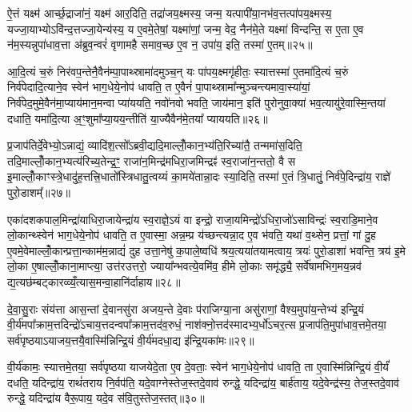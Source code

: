 ऐ॒त्तं यक्ष्म॑ आर्च्छ॒द्राजा॑नं॒ यक्ष्म॑ आर॒दिति॒ तद्रा॑जय॒क्ष्मस्य॒ जन्म॒ यत्पापी॑या॒नभ॑व॒त्तत्पा॑पय॒क्ष्मस्य॒ यज्जा॒याभ्यो\-ऽवि॑न्द॒त्तज्जा॒येन्य॑स्य॒ य ए॒वमे॒तेषां॒ यक्ष्मा॑णां॒ जन्म॒ वेद॒ नैन॑मे॒ते यक्ष्मा॑ विन्दन्ति॒ स ए॒ता ए॒व न॑म॒स्यन्नुपा॑धाव॒त्ता अ॑ब्रुव॒न्वरं॑ वृणामहै समाव॒च्छ ए॒व न॒ उपा॑य॒ इति॒ तस्मा॑ ए॒तम्॥२५॥

आ॒दि॒त्यं च॒रुं निर॑वप॒न्तेनै॒वैन॑म्पा॒पाथ्स्रामा॑दमुञ्च॒न् यः पा॑पय॒क्ष्मगृ॑हीतः॒ स्यात्तस्मा॑ ए॒तमा॑दि॒त्यं च॒रुं निर्व॑पेदादि॒त्याने॒व स्वेन॑ भाग॒धेये॒नोप॑ धावति॒ त ए॒वैनं॑ पा॒पाथ्स्रामा᳚न्मुञ्चन्त्यमावा॒स्या॑यां॒ निर्व॑पेद॒मुमे॒वैन॑मा॒प्याय॑मान॒मन्वा प्या॑ययति॒ नवो॑नवो भवति॒ जाय॑मान॒ इति॑ पुरोनुवा॒क्या॑ भव॒त्यायु॑रे॒वास्मि॒न्तया॑ दधाति॒ यमा॑दि॒त्या अ॒ꣳ॒शुमा᳚प्या॒यय॒न्तीति॑ या॒ज्यैवैन॑मे॒तया᳚ प्याययति॥२६॥

{\anuvakamend[{ए॒वोपै॒तम॑स्मि॒न्त्रयो॑दश च॥५॥}]}

प्र॒जाप॑तिर्दे॒वेभ्यो॒\-ऽन्नाद्यं॒ व्यादि॑श॒त्सो᳚\-ऽब्रवी॒द्यदि॒माल्लोँ॒कान॒भ्य॑ति॒रिच्या॑तै॒ तन्ममा॑स॒दिति॒ तदि॒माल्लोँ॒कान॒भ्यत्य॑रिच्य॒तेन्द्र॒ꣳ॒ राजा॑न॒मिन्द्र॑मधिरा॒जमिन्द्रꣴ॑ स्व॒राजा॑न॒न्ततो॒ वै स इ॒माल्लोँ॒काꣳस्त्रे॒धादु॑ह॒त्तत्त्रि॒धातो᳚स्त्रिधातु॒त्वय्यं का॒मये॑तान्ना॒दः स्या॒दिति॒ तस्मा॑ ए॒तं त्रि॒धातुं॒ निर्व॑पे॒दिन्द्रा॑य॒ राज्ञे॑ पुरो॒डाशम्᳚॥२७॥

एका॑दशकपाल॒मिन्द्रा॑याधिरा॒जायेन्द्रा॑य स्व॒राज्ञे॒\-ऽयं वा इन्द्रो॒ राजा॒यमिन्द्रो॑\-ऽधिरा॒जो॑\-ऽसाविन्द्रः॑ स्व॒राडि॒माने॒व लो॒कान्थ्स्वेन॑ भाग॒धेये॒नोप॑ धावति॒ त ए॒वास्मा॒ अन्न॒म्प्र य॑च्छन्त्यन्ना॒द ए॒व भ॑वति॒ यथा॑ व॒थ्सेन॒ प्रत्तां॒ गां दु॒ह ए॒वमे॒वेमाल्लोँ॒कान्प्रत्ता॒न्काम॑म॒न्नाद्यं॑ दुह उत्ता॒नेषु॑ क॒पाले॒ष्वधि॑ श्रय॒त्यया॑तयामत्वाय॒ त्रयः॑ पुरो॒डाशा॑ भवन्ति॒ त्रय॑ इ॒मे लो॒का ए॒षाल्लोँ॒काना॒माप्त्या॒ उत्त॑रउत्तरो॒ ज्याया᳚न्भवत्ये॒वमि॑व॒ हीमे लो॒काः समृ॑द्ध्यै॒ सर्वे॑षामभिग॒मय॒न्नव॑ द्य॒त्यछ॑म्बट्कारव्व्यँ॒त्यास॒मन्वा॒हानि॑र्दाहाय॥२८॥

{\anuvakamend[{पु॒रो॒डाश॒न्त्रय॒ष्षड्विꣳ॑शतिश्च॥६॥}]}

दे॒वा॒सु॒राः संय॑त्ता आस॒न्तां दे॒वानसु॑रा अजय॒न्ते दे॒वाः प॑राजिग्या॒ना असु॑राणां॒ वैश्य॒मुपा॑य॒न्तेभ्य॑ इन्द्रि॒यं वी॒र्य॑मपा᳚क्राम॒त्तदिन्द्रो॑\-ऽचाय॒त्तदन्वपा᳚क्राम॒त्तद॑व॒रुधं॒ नाश॑क्नो॒त्तद॑स्मादभ्य॒र्धो॑\-ऽचर॒त्स प्र॒जाप॑ति॒मुपा॑धाव॒त्तमे॒तया॒ सर्व॑पृष्ठया\-ऽयाजय॒त्तयै॒वास्मि॑न्निन्द्रि॒यं वी॒र्य॑मदधा॒द्य इ॑न्द्रि॒यका॑मः॥२९॥

वी॒र्य॑कामः॒ स्यात्तमे॒तया॒ सर्व॑पृष्ठया याजयेदे॒ता ए॒व दे॒वताः॒ स्वेन॑ भाग॒धेये॒नोप॑ धावति॒ ता ए॒वास्मि॑न्निन्द्रि॒यं वी॒र्यं॑ दधति॒ यदिन्द्रा॑य॒ राथं॑तराय नि॒र्वप॑ति॒ यदे॒वाग्नेस्तेज॒स्तदे॒वाव॑ रुन्द्धे॒ यदिन्द्रा॑य॒ बार्\mbox{}ह॑ताय॒ यदे॒वेन्द्र॑स्य॒ तेज॒स्तदे॒वाव॑ रुन्द्धे॒ यदिन्द्रा॑य वैरू॒पाय॒ यदे॒व स॑वि॒तुस्तेज॒स्तत्॥३०॥

